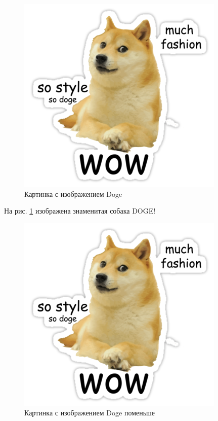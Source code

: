 \documentclass[12pt, a4paper]{article}  %
\begin{document}
\begin{figure}[H]
	\begin{center}
		\includegraphics[width=0.2\textheight]{doge.png}
	\end{center}
	\caption{Картинка с изображением Doge}\label{pic:doge}
\end{figure}

На рис. \ref{pic:doge} изображена знаменитая собака DOGE!


\begin{figure}[H]
	\caption{Картинка с изображением Doge поменьше}
	\begin{center}
		\includegraphics[width=0.1\textheight]{doge.png}
	\end{center}
\end{figure}
\end{document}
